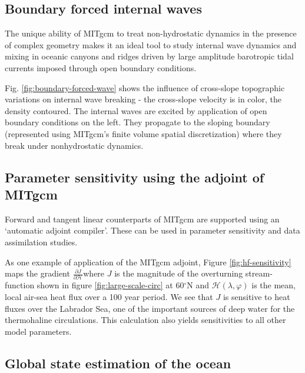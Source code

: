 

\subsection{Boundary forced internal waves}

The unique ability of MITgcm to treat non-hydrostatic dynamics in the
presence of complex geometry makes it an ideal tool to study internal wave
dynamics and mixing in oceanic canyons and ridges driven by large amplitude
barotropic tidal currents imposed through open boundary conditions.

Fig. \ref{fig:boundary-forced-wave} shows the influence of cross-slope 
topographic variations on
internal wave breaking - the cross-slope velocity is in color, the density
contoured. The internal waves are excited by application of open boundary
conditions on the left. They propagate to the sloping boundary (represented
using MITgcm's finite volume spatial discretization) where they break under
nonhydrostatic dynamics.



\subsection{Parameter sensitivity using the adjoint of MITgcm}

Forward and tangent linear counterparts of MITgcm are supported using an
`automatic adjoint compiler'. These can be used in parameter sensitivity and
data assimilation studies.

As one example of application of the MITgcm adjoint, Figure \ref{fig:hf-sensitivity}
maps the gradient $\frac{\partial J}{\partial \mathcal{H}}$where $J$ is the magnitude
of the overturning stream-function shown in figure \ref{fig:large-scale-circ}
at 60$^{\circ }$N and $
\mathcal{H}(\lambda,\varphi)$ is the mean, local air-sea heat flux over
a 100 year period. We see that $J$ is
sensitive to heat fluxes over the Labrador Sea, one of the important sources
of deep water for the thermohaline circulations. This calculation also
yields sensitivities to all other model parameters.



\subsection{Global state estimation of the ocean}

